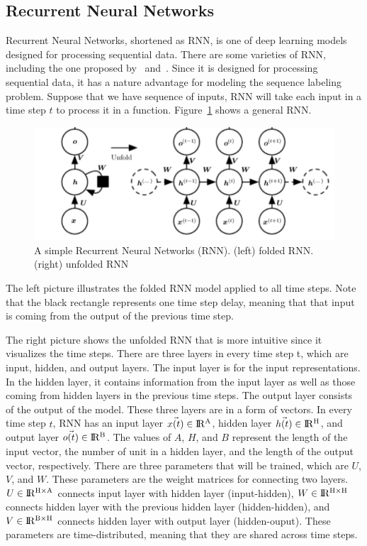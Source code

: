 \subsection{Recurrent Neural Networks}
Recurrent Neural Networks, shortened as RNN, is one of deep learning models designed for processing sequential data. There are some varieties of RNN, including the one proposed by~\cite{elman1990finding} and~\cite{jordan1986attractor}. Since it is designed for processing sequential data, it has a nature advantage for modeling the sequence labeling problem. Suppose that we have sequence of inputs, RNN will take each input in a time step $t$ to process it in a function. Figure~\ref{fig:simplernn} shows a general RNN.

\begin{figure}
	\centering
	\includegraphics[width=0.80\linewidth]{images/simplernn}
	\caption{A simple Recurrent Neural Networks (RNN). (left) folded RNN. (right) unfolded RNN}
	\label{fig:simplernn}
\end{figure}

The left picture illustrates the folded RNN model applied to all time steps. Note that the black rectangle represents one time step delay, meaning that that input is coming from the output of the previous time step. 

The right picture shows the unfolded RNN that is more intuitive since it visualizes the time steps. There are three layers in every time step t, which are input, hidden, and output layers. The input layer is for the input representations. In the hidden layer, it contains information from the input layer as well as those coming from hidden layers in the previous time steps. The output layer consists of the output of the model. These three layers are in a form of vectors. In every time step $t$, RNN has an input layer $ \vec{x(t)} \in {\rm I\!R^{A}} $, hidden layer $ \vec{h(t)} \in {\rm I\!R^{H}} $, and output layer $ \vec{o(t)} \in {\rm I\!R^{B}} $. The values of $A$, $H$, and $B$ represent the length of the input vector, the number of unit in a hidden layer, and the length of the output vector, respectively. There are three parameters that will be trained, which are $U$, $V$, and $W.$ These parameters are the weight matrices for connecting two layers. $ U \in {\rm I\!R^{H \times A }}$ connects input layer with hidden layer (input-hidden), $ W \in {\rm I\!R^{H \times H}}$ connects hidden layer with the previous hidden layer (hidden-hidden), and $ V \in {\rm I\!R^{B \times H}}$ connects hidden layer with output layer (hidden-ouput). These parameters are time-distributed, meaning that they are shared across time steps. 

